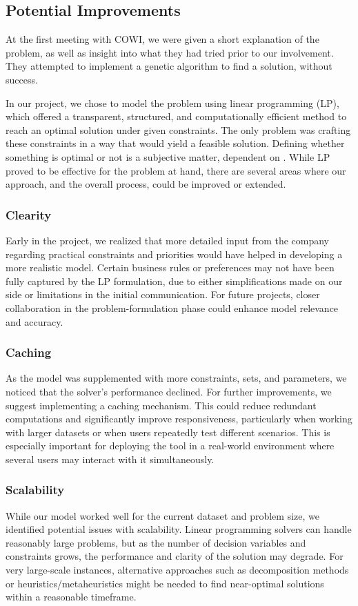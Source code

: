 \documentclass{article}
\begin{document}
\subsection{Potential Improvements}
At the first meeting with COWI, we were given a short explanation of the problem, as well as insight 
into what they had tried prior to our involvement. They attempted to implement a genetic algorithm 
to find a solution, without success.

In our project, we chose to model the problem using linear programming (LP), which offered a transparent, 
structured, and computationally efficient method to reach an optimal solution under given constraints. The 
only problem was crafting these constraints in a way that would yield a feasible solution. Defining whether something 
is optimal or not is a subjective matter, dependent on . While LP proved to 
be effective for the problem at hand, there are several areas where our approach, and the overall process, could be 
improved or extended. 

\subsubsection{Clearity}
Early in the project, we realized that more detailed input from the company regarding practical constraints 
and priorities would have helped in developing a more realistic model. Certain business rules or preferences 
may not have been fully captured by the LP formulation, due to either simplifications made on our side or 
limitations in the initial communication. For future projects, closer collaboration in the problem-formulation 
phase could enhance model relevance and accuracy.

\subsubsection{Caching}
As the model was supplemented with more constraints, sets, and parameters, we noticed that the solver's performance 
declined. For further improvements, we suggest implementing a caching mechanism. This could reduce redundant computations 
and significantly improve responsiveness, particularly when working with larger datasets or when users repeatedly 
test different scenarios. This is especially important for deploying the tool in a real-world environment where several 
users may interact with it simultaneously.

\subsubsection{Scalability}
While our model worked well for the current dataset and problem size, we identified potential issues with scalability. 
Linear programming solvers can handle reasonably large problems, but as the number of decision variables and constraints 
grows, the performance and clarity of the solution may degrade. For very large-scale instances, alternative approaches 
such as decomposition methods or heuristics/metaheuristics might be needed to find near-optimal solutions within a 
reasonable timeframe.
\end{document}

